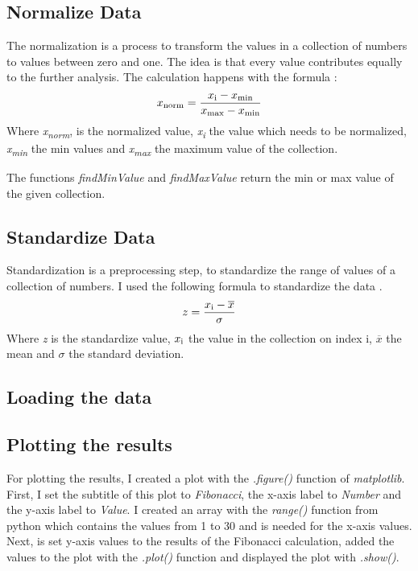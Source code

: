 \documentclass[10pt, a4paper, twocolumn]{article} %
\begin{document}
\subsection{Normalize Data}
The normalization is a process to transform the values in a collection of numbers to values between zero and one. The idea is that every value contributes equally to the further analysis. The calculation happens with the formula \citep{normalizeDataStatology}: 
\[
x\textsubscript{norm} = \frac{x\textsubscript{i} - x\textsubscript{min}} {x\textsubscript{max} - x\textsubscript{min}}
\]
Where \textit{x\textsubscript{norm}}, is the normalized value, \textit{x\textsubscript{i}} the value which needs to be normalized, \textit{x\textsubscript{min}} the min values and \textit{x\textsubscript{max}} the maximum value of the collection. 

The functions \textit{findMinValue} and \textit{findMaxValue} return the min or max value of the given collection. 

\subsection{Standardize Data}
Standardization is a preprocessing step, to standardize the range of values of a collection of numbers. I used the following formula to standardize the data
\citep{standardizeDataBuildIn}. 
\[
z = \frac{x\textsubscript{i} - \overline{x}}{\sigma}
\]
Where \textit{z} is the standardize value, \textit{$x\textsubscript{i}$} the value in the collection on index i, \textit{$\overline{x}$} the mean and \textit{$\sigma$} the standard deviation.
                                                                                                                                                                                                                                                             
\subsection{Loading the data}
\subsection{Plotting the results}
For plotting the results, I created a plot with the \textit{.figure()} function of \textit{matplotlib}. First, I set the subtitle of this plot to \textit{Fibonacci}, the x-axis label to \textit{Number} and the y-axis label to \textit{Value}. I created an array with the \textit{range()} function from python which contains the values from 1 to 30 and is needed for the x-axis values. Next, is set y-axis values to the results of the Fibonacci calculation, added the values to the plot with the  \textit{.plot()} function and displayed the plot with \textit{.show()}.
\end{document}
